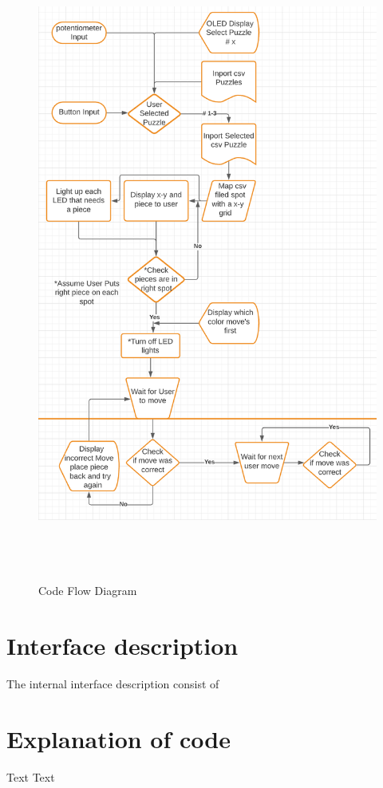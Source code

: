 \documentclass[11pt]{article}
\begin{document}
\begin{center}
\begin{figure}
  \includegraphics[width=17cm,height=21cm]{./Pics/Code_Flow_Diagram.PNG}
  \caption{Code Flow Diagram}
  \label{fig:CFD1}
\end{figure}
\end{center}

\section{Interface description}
The internal interface description consist of 


\section{Explanation of code}
Text Text
\end{document}
